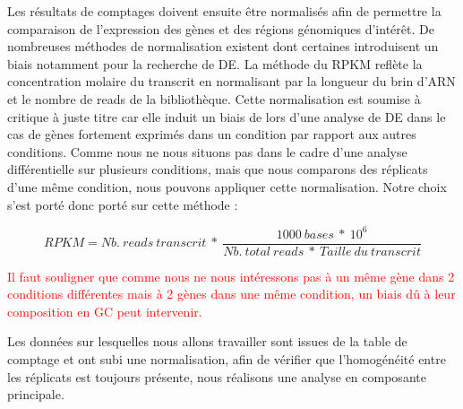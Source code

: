\documentclass[12pt,a4paper]{report}
\begin{document}
\begin{onehalfspace}
Les résultats de comptages doivent ensuite être normalisés afin de permettre la comparaison de l'expression des gènes et des régions génomiques d'intérêt. De nombreuses méthodes de normalisation existent dont certaines introduisent un biais notamment pour la recherche de DE. La méthode du RPKM reflète la concentration molaire du transcrit en normalisant par la longueur du brin d'ARN et le nombre de reads de la bibliothèque. Cette normalisation est soumise à critique à juste titre \citep{Dillies2013} car elle induit un biais de lors d'une analyse de DE dans le cas de gènes fortement exprimés dans un condition par rapport aux autres conditions. Comme nous ne nous situons pas dans le cadre d'une analyse différentielle sur plusieurs conditions, mais que nous comparons des réplicats d'une même condition, nous pouvons appliquer cette normalisation. Notre choix s'est porté donc porté sur cette méthode \citep{Mortazavi2008} :

\[RPKM = Nb.~reads~transcrit~*~\frac{1000~bases~*~10^6}{Nb.~total~reads~*~Taille~du~transcrit}\]

\textcolor{red}{Il faut souligner que comme nous ne nous intéressons pas à un même gène dans 2 conditions différentes mais à 2 gènes dans une même condition, un biais dû à leur composition en GC peut intervenir.}

Les données sur lesquelles nous allons travailler sont issues de la table de comptage et ont subi une normalisation, afin de vérifier que l'homogénéité entre les réplicats est toujours présente, nous réalisons une analyse en composante principale.



\end{onehalfspace}
\end{document}
